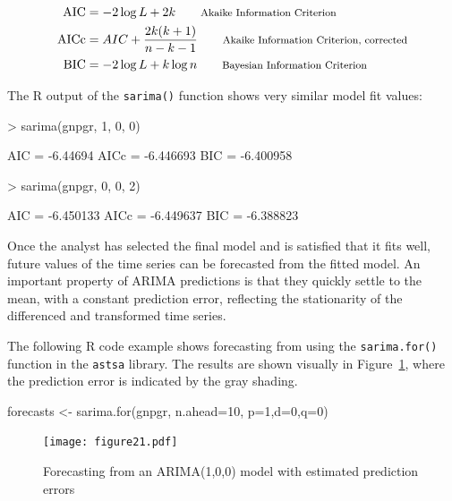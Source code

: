 \begin{align*}
\operatorname{AIC} &= -2 \log L + 2k  \qquad \text{\footnotesize Akaike Information Criterion}\index{Akaike information criterion}\index{AIC|see{Akaike information criterion}}\\
\operatorname{AICc} &= AIC + \frac{2k(k+1)}{n-k-1} \qquad \text{\footnotesize Akaike Information Criterion, corrected}\\
\operatorname{BIC} &= -2 \log L + k \log n \qquad \text{\footnotesize Bayesian Information Criterion}\index{Bayesian information criterion}\index{BIC|see{Bayesian information criterion}}
\end{align*}

\noindent The R output of the \texttt{sarima()} function shows very similar model fit values:

\begin{textcode}
> sarima(gnpgr, 1, 0, 0)

AIC = -6.44694  AICc = -6.446693  BIC = -6.400958 
\end{textcode}

\begin{textcode}
> sarima(gnpgr, 0, 0, 2)

AIC = -6.450133  AICc = -6.449637  BIC = -6.388823 
\end{textcode}

Once the analyst has selected the final model and is satisfied that it fits well, future values of the time series can be forecasted from the fitted model. An important property of ARIMA predictions is that they quickly settle to the mean, with a constant prediction error, reflecting the stationarity of the differenced and transformed time series.

The following R code example shows forecasting from using the \texttt{sarima.for()} function in the \texttt{astsa} library. The results are shown visually in Figure~\ref{fig:figure21}, where the prediction error is indicated by the gray shading.

\begin{Rcode}
forecasts <- sarima.for(gnpgr, n.ahead=10, p=1,d=0,q=0)
\end{Rcode}

\begin{figure}
\centering
\texttt{[image: figure21.pdf]}
\caption[Forecasting from an ARIMA(1,0,0) model]{Forecasting from an ARIMA(1,0,0) model with estimated prediction errors}
\label{fig:figure21}
\end{figure}

